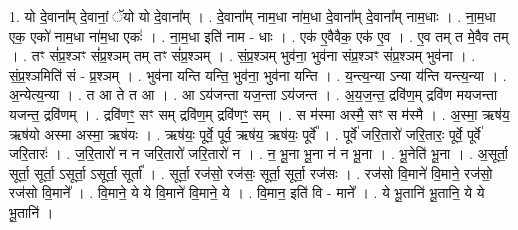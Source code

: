 \documentclass[17pt]{extarticle}
\begin{document}
1. यो दे॒वाना᳚म् दे॒वानां॒ ॅयो यो दे॒वाना᳚म् । . दे॒वाना᳚म् नाम॒धा ना॑म॒धा दे॒वाना᳚म् दे॒वाना᳚म् नाम॒धाः । . ना॒म॒धा एक॒ एको॑ नाम॒धा ना॑म॒धा एकः॑ । . ना॒म॒धा इति॑ नाम - धाः । . एक॑ ए॒वैवैक॒ एक॑ ए॒व । . ए॒व तम् त मे॒वैव तम् । . तꣳ सं॑प्र॒श्ञꣳ सं॑प्र॒श्ञम् तम् तꣳ सं॑प्र॒श्ञम् । . सं॒प्र॒श्ञम् भुव॑ना॒ भुव॑ना संप्र॒श्ञꣳ सं॑प्र॒श्ञम् भुव॑ना । . सं॒प्र॒श्ञमिति॑ सं - प्र॒श्ञम् । . भुव॑ना यन्ति यन्ति॒ भुव॑ना॒ भुव॑ना यन्ति । . य॒न्त्य॒न्या ऽन्या य॑न्ति यन्त्य॒न्या । . अ॒न्येत्य॒न्या । . त आ ते त आ । . आ ऽय॑जन्ता यज॒न्ता ऽय॑जन्त । . अ॒य॒ज॒न्त॒ द्रवि॑ण॒म् द्रवि॑ण मयजन्ता यजन्त॒ द्रवि॑णम् । . द्रवि॑णꣳ॒॒ सꣳ सम् द्रवि॑ण॒म् द्रवि॑णꣳ॒॒ सम् । . स म॑स्मा अस्मै॒ सꣳ स म॑स्मै । . अ॒स्मा॒ ऋष॑य॒ ऋष॑यो अस्मा अस्मा॒ ऋष॑यः । . ऋष॑यः॒ पूर्वे॒ पूर्व॒ ऋष॑य॒ ऋष॑यः॒ पूर्वे᳚ । . पूर्वे॑ जरि॒तारो॑ जरि॒तारः॒ पूर्वे॒ पूर्वे॑ जरि॒तारः॑ । . ज॒रि॒तारो॑ न न जरि॒तारो॑ जरि॒तारो॑ न । . न॒ भू॒ना भू॒ना न॑ न भू॒ना । . भू॒नेति॑ भू॒ना । . अ॒सूर्ता॒ सूर्ता॒ सूर्ता॒ ऽसूर्ता॒ ऽसूर्ता॒ सूर्ता᳚ । . सूर्ता॒ रज॑सो॒ रज॑सः॒ सूर्ता॒ सूर्ता॒ रज॑सः । . रज॑सो वि॒माने॑ वि॒माने॒ रज॑सो॒ रज॑सो वि॒माने᳚ । . वि॒माने॒ ये ये वि॒माने॑ वि॒माने॒ ये । . वि॒मान॒ इति॑ वि - माने᳚ । . ये भू॒तानि॑ भू॒तानि॒ ये ये भू॒तानि॑ । \newline
\end{document}
